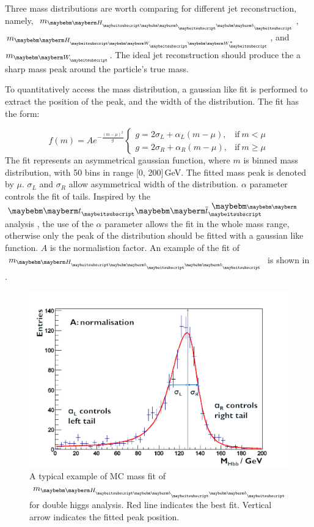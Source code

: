 Three mass distributions are worth comparing for different jet reconstruction, namely, $m_{\Hbb}$, $m_{\HWW}$, and $m_{\PW}$. The ideal jet reconstruction should produce the a sharp mass peak around the particle's true mass.

To quantitatively access the mass distribution, a gaussian like fit is performed to extract the position of the peak, and the width of the distribution. The fit has the form:

\begin{equation}
f(m)=A e^{- \frac{(m - \mu)^2}{g}}
\begin{cases}
  g = 2\sigma_L + \alpha_L(m - \mu), & \text{if}\ m < \mu\\
  g = 2\sigma_R + \alpha_R(m - \mu), & \text{if}\ m \geqslant \mu
\end{cases}
\end{equation}
The fit represents an asymmetrical gaussian function, where $m$ is binned mass distribution, with 50 bins in range [0, 200]\,GeV. The fitted mass peak is denoted by $\mu$. $\sigma_L$ and $\sigma_R$ allow asymmetrical width of the distribution. $\alpha$ parameter controls the fit of tails. Inspired by the $\Ptop\APtop$  analysis \cite{}, the use of the $\alpha$ parameter allows the fit in the whole mass range, otherwise only the peak of the distribution should be fitted with a gaussian like function. $A$ is the normalistion factor. An example of the fit of $m_{\Hbb}$ is shown in .

\begin{figure}[!tbp]
\includegraphics[width=\largefigwidth]{doubleHiggs/MCmassFit}
\caption[Example MC mass fit for double higgs analysis]%
   {A typical example of MC mass fit of $m_{\Hbb}$ for double higgs analysis. Red line indicates the best fit. Vertical arrow indicates the fitted peak position.}
   \label{fig:doubleHiggsFitMCMass}
\end{figure}

